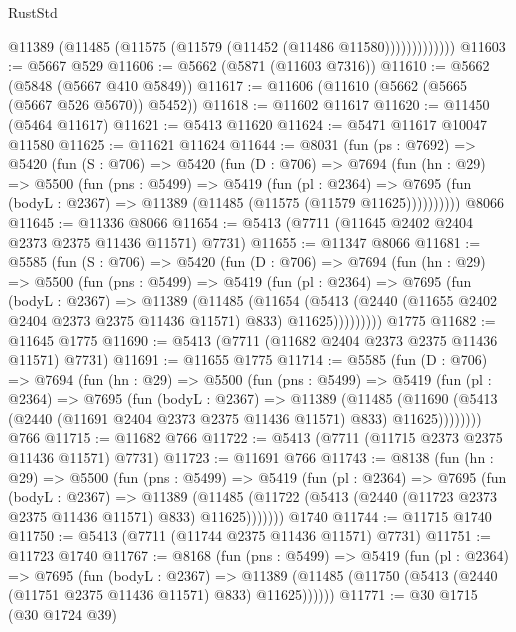 \begin{lexlean}{RustStd}
\begin{coremodule}
                  @11389 (@11485 (@11575 (@11579 (@11452 (@11486 @11580)))))))))))))
@11603 := @5667 @529
@11606 := @5662 (@5871 (@11603 @7316))
@11610 := @5662 (@5848 (@5667 @410 @5849))
@11617 := @11606 (@11610 (@5662 (@5665 (@5667 @526 @5670)) @5452))
@11618 := @11602 @11617
@11620 := @11450 (@5464 @11617)
@11621 := @5413 @11620
@11624 := @5471 @11617 @10047 @11580
@11625 := @11621 @11624
@11644 := @8031
    (fun (ps : @7692) =>
    @5420
      (fun (S : @706) =>
      @5420
        (fun (D : @706) =>
        @7694
          (fun (hn : @29) =>
          @5500
            (fun (pns : @5499) =>
            @5419
              (fun (pl : @2364) =>
              @7695 (fun (bodyL : @2367) => @11389 (@11485 (@11575 (@11579 @11625))))))))))
    @8066
@11645 := @11336 @8066
@11654 := @5413 (@7711 (@11645 @2402 @2404 @2373 @2375 @11436 @11571) @7731)
@11655 := @11347 @8066
@11681 := @5585
    (fun (S : @706) =>
    @5420
      (fun (D : @706) =>
      @7694
        (fun (hn : @29) =>
        @5500
          (fun (pns : @5499) =>
          @5419
            (fun (pl : @2364) =>
            @7695
              (fun (bodyL : @2367) =>
              @11389
                (@11485
                  (@11654
                    (@5413
                      (@2440 (@11655 @2402 @2404 @2373 @2375 @11436 @11571) @833)
                      @11625)))))))))
    @1775
@11682 := @11645 @1775
@11690 := @5413 (@7711 (@11682 @2404 @2373 @2375 @11436 @11571) @7731)
@11691 := @11655 @1775
@11714 := @5585
    (fun (D : @706) =>
    @7694
      (fun (hn : @29) =>
      @5500
        (fun (pns : @5499) =>
        @5419
          (fun (pl : @2364) =>
          @7695
            (fun (bodyL : @2367) =>
            @11389
              (@11485
                (@11690 (@5413 (@2440 (@11691 @2404 @2373 @2375 @11436 @11571) @833) @11625))))))))
    @766
@11715 := @11682 @766
@11722 := @5413 (@7711 (@11715 @2373 @2375 @11436 @11571) @7731)
@11723 := @11691 @766
@11743 := @8138
    (fun (hn : @29) =>
    @5500
      (fun (pns : @5499) =>
      @5419
        (fun (pl : @2364) =>
        @7695
          (fun (bodyL : @2367) =>
          @11389
            (@11485 (@11722 (@5413 (@2440 (@11723 @2373 @2375 @11436 @11571) @833) @11625)))))))
    @1740
@11744 := @11715 @1740
@11750 := @5413 (@7711 (@11744 @2375 @11436 @11571) @7731)
@11751 := @11723 @1740
@11767 := @8168
    (fun (pns : @5499) =>
    @5419
      (fun (pl : @2364) =>
      @7695
        (fun (bodyL : @2367) =>
        @11389 (@11485 (@11750 (@5413 (@2440 (@11751 @2375 @11436 @11571) @833) @11625))))))
@11771 := @30 @1715 (@30 @1724 @39)

\end{coremodule}
\end{lexlean}
